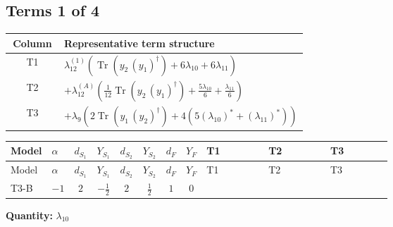 \documentclass[8pt]{article}
\begin{document}
\begin{landscape}
\subsection*{Terms 1 of 4}
\begin{center}
\begin{tabular}{@{}c >{\raggedright\arraybackslash}p{0.82\linewidth}@{}}
\toprule
Column & Representative term structure \\
\midrule
T1 & \(\displaystyle {\lambda_{12}^{(1)}} (\operatorname{Tr}\!\left({y_2}\,\left({y_1}\right)^{\dagger}\right)+6 {\lambda_{10}}+6 {\lambda_{11}})\) \\
\midrule
T2 & \(\displaystyle +{\lambda_{12}^{(A)}} \left(\frac{1}{12} \operatorname{Tr}\!\left({y_2}\,\left({y_1}\right)^{\dagger}\right)+\frac{5 {\lambda_{10}}}{6}+\frac{{\lambda_{11}}}{6}\right)\) \\
\midrule
T3 & \(\displaystyle +{\lambda_{9}} (2 \operatorname{Tr}\!\left({y_1}\,\left({y_2}\right)^{\dagger}\right)+4 (5 \left({\lambda_{10}}\right)^{*}+\left({\lambda_{11}}\right)^{*}))\) \\
\midrule
\bottomrule
\end{tabular}
\end{center}
\smallskip
\tiny
\begin{longtable}{@{}llcccccc >{\raggedright\arraybackslash}p{0.21\linewidth} >{\raggedright\arraybackslash}p{0.21\linewidth} >{\raggedright\arraybackslash}p{0.21\linewidth}@{}}
\toprule
Model & $\alpha$ & $d_{S_1}$ & $Y_{S_1}$ & $d_{S_2}$ & $Y_{S_2}$ & $d_F$ & $Y_F$ & T1 & T2 & T3 \\
\midrule
\endfirsthead
\toprule
Model & $\alpha$ & $d_{S_1}$ & $Y_{S_1}$ & $d_{S_2}$ & $Y_{S_2}$ & $d_F$ & $Y_F$ & T1 & T2 & T3 \\
\midrule
\endhead
T3-B & $-1$ & $2$ & $-\frac{1}{2}$ & $2$ & $\frac{1}{2}$ & $1$ & $0$ & \scriptsize\adjustbox{max width=\linewidth}{$\begin{gathered} {\lambda_{12}^{(1)}} (\operatorname{Tr}\!\left({y_2}\,\left({y_1}\right)^{\dagger}\right)+6 {\lambda_{10}}+6 {\lambda_{11}})\end{gathered}$} & \scriptsize\adjustbox{max width=\linewidth}{$\begin{gathered} +{\lambda_{12}^{(A)}} \left(\frac{1}{12} \operatorname{Tr}\!\left({y_2}\,\left({y_1}\right)^{\dagger}\right)+\frac{5 {\lambda_{10}}}{6}+\frac{{\lambda_{11}}}{6}\right)\end{gathered}$} & \scriptsize\adjustbox{max width=\linewidth}{$\begin{gathered} +{\lambda_{9}} (2 \operatorname{Tr}\!\left({y_1}\,\left({y_2}\right)^{\dagger}\right)+4 (5 \left({\lambda_{10}}\right)^{*}+\left({\lambda_{11}}\right)^{*}))\end{gathered}$} \\
\midrule
\bottomrule
\end{longtable}
\clearpage
\noindent\textbf{Quantity: }$\lambda_{10}$\par\smallskip

\end{landscape}
\end{document}
